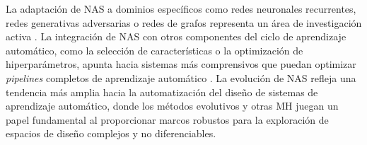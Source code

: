 La adaptación de NAS a dominios específicos como redes neuronales recurrentes, redes generativas adversarias o redes de grafos representa un área de investigación activa \cite{Gao2020}. La integración de NAS con otros componentes del ciclo de aprendizaje automático, como la selección de características o la optimización de hiperparámetros, apunta hacia sistemas más comprensivos que puedan optimizar \textit{pipelines} completos de aprendizaje automático \cite{Kaveh2023}. La evolución de NAS refleja una tendencia más amplia hacia la automatización del diseño de sistemas de aprendizaje automático, donde los métodos evolutivos y otras MH juegan un papel fundamental al proporcionar marcos robustos para la exploración de espacios de diseño complejos y no diferenciables.




